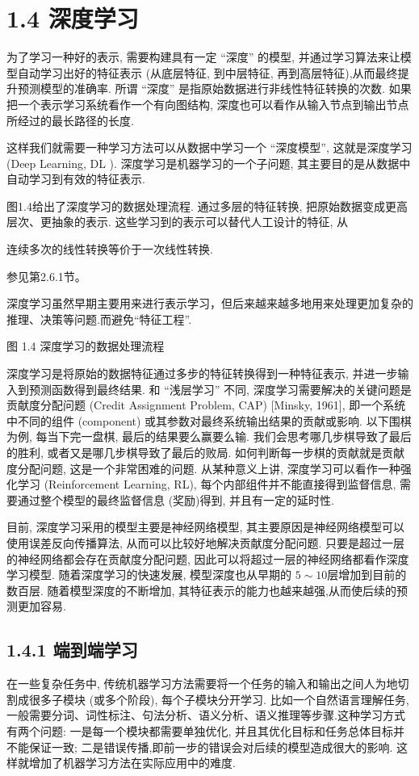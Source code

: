 \documentclass[10pt]{article}
\begin{document}
\section*{1.4 深度学习}
为了学习一种好的表示, 需要构建具有一定 “深度” 的模型, 并通过学习算法来让模型自动学习出好的特征表示 (从底层特征, 到中层特征, 再到高层特征),从而最终提升预测模型的准确率. 所谓 “深度” 是指原始数据进行非线性特征转换的次数. 如果把一个表示学习系统看作一个有向图结构, 深度也可以看作从输入节点到输出节点所经过的最长路径的长度.

这样我们就需要一种学习方法可以从数据中学习一个 “深度模型”, 这就是深度学习 (Deep Learning, DL ). 深度学习是机器学习的一个子问题, 其主要目的是从数据中自动学习到有效的特征表示.

图1.4给出了深度学习的数据处理流程. 通过多层的特征转换, 把原始数据变成更高层次、更抽象的表示. 这些学习到的表示可以替代人工设计的特征, 从

连续多次的线性转换等价于一次线性转换.

参见第2.6.1节。

深度学习虽然早期主要用来进行表示学习，但后来越来越多地用来处理更加复杂的推理、决策等问题.而避免“特征工程”.



图 1.4 深度学习的数据处理流程

深度学习是将原始的数据特征通过多步的特征转换得到一种特征表示, 并进一步输入到预测函数得到最终结果. 和 “浅层学习” 不同, 深度学习需要解决的关键问题是贡献度分配问题 (Credit Assignment Problem, CAP) [Minsky, 1961], 即一个系统中不同的组件 (component) 或其参数对最终系统输出结果的贡献或影响. 以下围棋为例, 每当下完一盘棋, 最后的结果要么赢要么输. 我们会思考哪几步棋导致了最后的胜利, 或者又是哪几步棋导致了最后的败局. 如何判断每一步棋的贡献就是贡献度分配问题, 这是一个非常困难的问题. 从某种意义上讲, 深度学习可以看作一种强化学习 (Reinforcement Learning, RL), 每个内部组件并不能直接得到监督信息, 需要通过整个模型的最终监督信息 (奖励)得到, 并且有一定的延时性.

目前, 深度学习采用的模型主要是神经网络模型, 其主要原因是神经网络模型可以使用误差反向传播算法, 从而可以比较好地解决贡献度分配问题. 只要是超过一层的神经网络都会存在贡献度分配问题, 因此可以将超过一层的神经网络都看作深度学习模型. 随着深度学习的快速发展, 模型深度也从早期的 $5 \sim 10$层增加到目前的数百层. 随着模型深度的不断增加, 其特征表示的能力也越来越强,从而使后续的预测更加容易.

\subsection*{1.4.1 端到端学习}
在一些复杂任务中, 传统机器学习方法需要将一个任务的输入和输出之间人为地切割成很多子模块 (或多个阶段), 每个子模块分开学习. 比如一个自然语言理解任务,一般需要分词、词性标注、句法分析、语义分析、语义推理等步骤.这种学习方式有两个问题: 一是每一个模块都需要单独优化, 并且其优化目标和任务总体目标并不能保证一致; 二是错误传播,即前一步的错误会对后续的模型造成很大的影响. 这样就增加了机器学习方法在实际应用中的难度.
\end{document}
